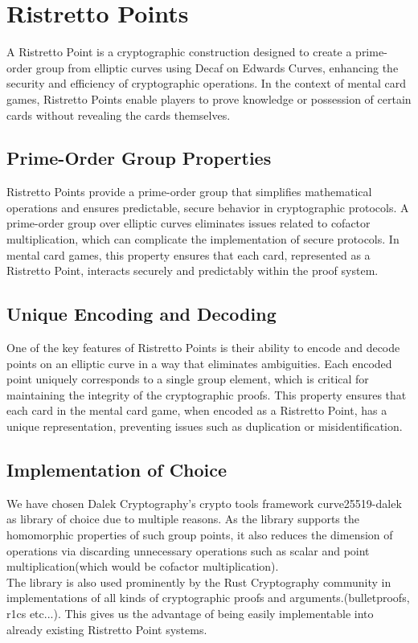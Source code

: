 \documentclass[12pt,a4paper]{report}
\begin{document}
\section{Ristretto Points}
A Ristretto Point is a cryptographic construction designed to create a
prime-order group from elliptic curves using Decaf on Edwards Curves, 
enhancing the security and efficiency of cryptographic operations. 
In the context of mental card games, Ristretto Points 
enable players to prove knowledge or 
possession of certain cards without revealing the cards themselves.

\subsection{Prime-Order Group Properties}
Ristretto Points provide a prime-order group that simplifies 
mathematical operations and ensures predictable, 
secure behavior in cryptographic protocols.
A prime-order group over elliptic curves eliminates issues related to cofactor multiplication, which can complicate the implementation of secure protocols.
In mental card games, this property ensures that each card, represented as a Ristretto Point, interacts securely and predictably within the proof system.

\subsection{Unique Encoding and Decoding}
One of the key features of Ristretto Points is their ability to encode and decode points on an elliptic curve in a way that eliminates ambiguities.
Each encoded point uniquely corresponds to a single group element, which is critical for maintaining the integrity of the cryptographic proofs.
This property ensures that each card in the mental card game, when encoded as a Ristretto Point, has a unique representation, preventing issues such as duplication or misidentification.

\subsection{Implementation of Choice}
We have chosen Dalek Cryptography's crypto tools framework curve25519-dalek\cite{dalek:curve}
as library of choice due to multiple reasons.
As the library supports the homomorphic properties of such group points, it also reduces the dimension of operations via discarding unnecessary operations such as scalar and point multiplication(which would be cofactor multiplication).\\
The library is also used prominently by the Rust Cryptography community in 
implementations of all kinds of cryptographic proofs and arguments.(bulletproofs, r1cs etc...). This gives us the advantage of being easily implementable into already existing Ristretto Point systems.
\end{document}

